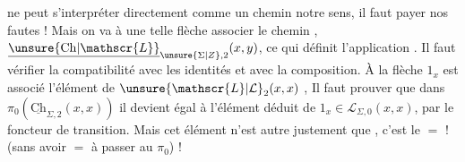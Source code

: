 ne peut s'interpréter directement comme un chemin
 notre sens, il faut payer nos fautes ! Mais
on va à une telle flèche associer le chemin
,
  $\underline{\unsure{\mathrm{Ch}|\mathscr{L}}}_{\unsure{\Sigma|Z},2}(x,y)$, ce qui définit l'application .
Il faut vérifier la compatibilité avec les identités
et avec la composition. À la flèche $1_x$  est associé
l'élément de $\unsure{\mathscr{L}|\mathcal{L}}_2(x,x)$
,
Il faut prouver que dans $\pi_0(\underline{\mathrm{Ch}}_{\Sigma,2}(x,x))$ il devient
égal à l'élément déduit de $1_x\in\mathscr{L}_{\Sigma,0}(x,x)$,
par le foncteur de transition. Mais cet élément
n'est autre justement que
,
c'est le $=$ ! (sans avoir $=$ à passer au $\pi_0$) !

